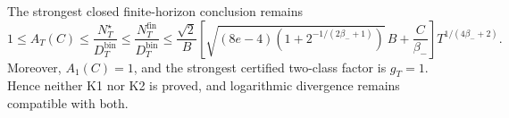 The strongest closed finite-horizon conclusion remains
\[
1\le A_T(C)\le\frac{N_T^\star}{D_T^{\mathrm{bin}}}\le\frac{N_T^{\mathrm{fin}}}{D_T^{\mathrm{bin}}}\le\frac{\sqrt2}{B}\left[\sqrt{(8e-4)\left(1+2^{-1/(2\beta_-+1)}\right)}\,B+\frac C{\beta_-}\right]T^{1/(4\beta_-+2)}.
\]
Moreover, \(A_1(C)=1\), and the strongest certified two-class factor is \(g_T=1\). Hence neither K1 nor K2 is proved, and logarithmic divergence remains compatible with both.